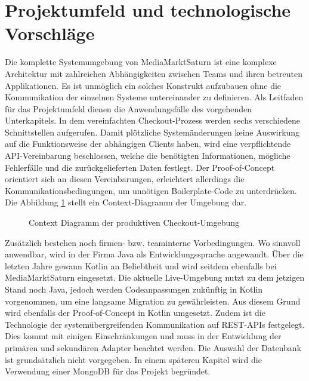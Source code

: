 \section{Projektumfeld und technologische Vorschläge}

Die komplette Systemumgebung von MediaMarktSaturn ist eine komplexe Architektur mit zahlreichen Abhängigkeiten zwischen Teams und ihren betreuten Applikationen. Es ist unmöglich ein solches Konstrukt aufzubauen ohne die Kommunikation der einzelnen Systeme untereinander zu definieren. Als Leitfaden für das Projektumfeld dienen die Anwendungsfälle des vorgehenden Unterkapitels. In dem vereinfachten Checkout-Prozess werden sechs verschiedene Schnittstellen aufgerufen. Damit plötzliche Systemänderungen keine Auswirkung auf die Funktionsweise der abhängigen Clients haben, wird eine verpflichtende API-Vereinbarung beschlossen, welche die benötigten Informationen, mögliche Fehlerfälle und die zurückgelieferten Daten festlegt. Der Proof-of-Concept orientiert sich an diesen Vereinbarungen, erleichtert allerdings die Kommunikationsbedingungen, um unnötigen \Gls{Boilerplate-Code} zu unterdrücken. Die Abbildung \ref{fig:ContextDiagramm} stellt ein Context-Diagramm der Umgebung dar.

\begin{figure}[htbp]
	\centering
	
	\caption{Context Diagramm der produktiven Checkout-Umgebung}
	\label{fig:ContextDiagramm}
\end{figure}

Zusätzlich bestehen noch firmen- bzw. teaminterne Vorbedingungen. Wo sinnvoll anwendbar, wird in der Firma Java als Entwicklungssprache angewandt. Über die letzten Jahre gewann Kotlin an Beliebtheit und wird seitdem ebenfalls bei MediaMarktSaturn eingesetzt. Die aktuelle Live-Umgebung nutzt zu dem jetzigen Stand noch Java, jedoch werden Codeanpassungen zukünftig in Kotlin vorgenommen, um eine langsame Migration zu gewährleisten. Aus diesem Grund wird ebenfalls der Proof-of-Concept in Kotlin umgesetzt. Zudem ist die Technologie der systemübergreifenden Kommunikation auf REST-APIs festgelegt. Dies kommt mit einigen Einschränkungen und muss in der Entwicklung der primären und sekundären Adapter beachtet werden. Die Auswahl der Datenbank ist grundsätzlich nicht vorgegeben. In einem späteren Kapitel wird die Verwendung einer MongoDB für das Projekt begründet.
